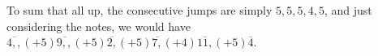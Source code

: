 \documentclass[preview]{standalone}
\begin{document}
\begin{center}
To sum that all up, the consecutive jumps are simply $5, 5, 5, 4, 5$, and just considering the notes, we would have $\overline{4,,} (+5) \overline{9,,} (+5) \overline{2,} (+5) \overline{7,} (+4) \overline{11,} (+5) \overline{4}$.
\end{center}
\end{document}
